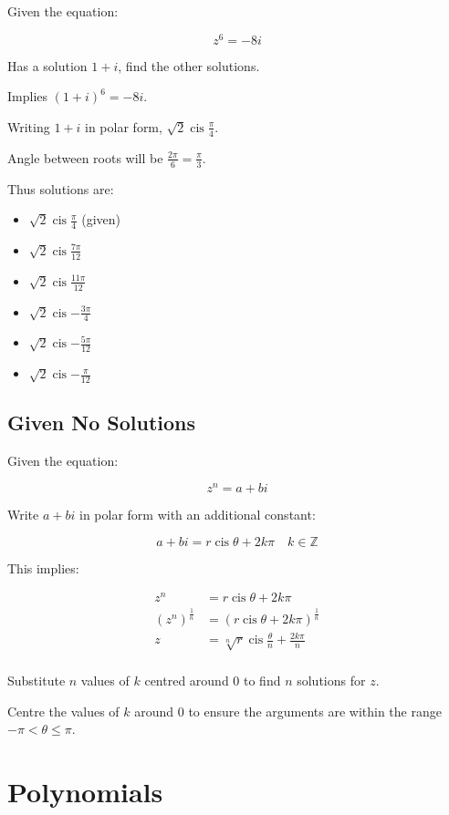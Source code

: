 \documentclass[a4paper,11pt]{article}
\DeclareMathOperator\cis{cis}
\begin{document}
Given the equation:

$$
z^6 = -8i
$$

Has a solution $1 + i$, find the other solutions.

Implies $(1 + i)^6 = -8i$.

Writing $1 + i$ in polar form, $\sqrt{2} \cis{\frac{\pi}{4}}$.

Angle between roots will be $\frac{2\pi}{6} = \frac{\pi}{3}$.

Thus solutions are:

\begin{itemize}
\item $\sqrt{2} \cis{\frac{\pi}{4}}$ (given)
\item $\sqrt{2} \cis{\frac{7\pi}{12}}$
\item $\sqrt{2} \cis{\frac{11\pi}{12}}$
\item $\sqrt{2} \cis{-\frac{3\pi}{4}}$
\item $\sqrt{2} \cis{-\frac{5\pi}{12}}$
\item $\sqrt{2} \cis{-\frac{\pi}{12}}$
\end{itemize}


\subsection{Given No Solutions}

Given the equation:

$$
z^n = a + bi
$$

Write $a + bi$ in polar form with an additional constant:

$$
a + bi = r \cis{\theta + 2k\pi} \quad k \in \mathbb{Z}
$$

This implies:

$$
\begin{aligned}
z^n & = r \cis{\theta + 2k\pi} \\
(z^n)^{\frac{1}{n}} & = (r \cis{\theta + 2k\pi})^{\frac{1}{n}} \\
z & = \sqrt[n]{r} \cis{\frac{\theta}{n} + \frac{2k\pi}{n}} \\
\end{aligned}
$$

Substitute $n$ values of $k$ centred around 0 to find $n$ solutions for $z$.

Centre the values of $k$ around 0 to ensure the arguments are within the range
$-\pi < \theta \leq \pi$.




\section{Polynomials}
\end{document}
